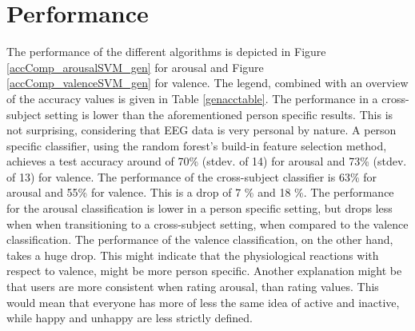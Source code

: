 \section{Performance}
The performance of the different algorithms is depicted in Figure \ref{accComp_arousalSVM_gen} for arousal and Figure \ref{accComp_valenceSVM_gen} for valence. The legend, combined with an overview of the accuracy values is given in Table \ref{genacctable}. The performance in a cross-subject setting is lower than the aforementioned person specific results. This is not surprising, considering that EEG data is very personal by nature. A person specific classifier, using the random forest's build-in feature selection method, achieves a test accuracy around of 70\% (stdev. of 14) for arousal and 73\% (stdev. of 13) for valence. The performance of the cross-subject classifier is 63\% for arousal and 55\% for valence. This is a drop of 7 \% and 18 \%. The performance for the arousal classification is lower in a person specific setting, but drops less when when transitioning to a cross-subject setting, when compared to the valence classification. The performance of the valence classification, on the other hand, takes a huge drop. This might indicate that the physiological reactions with respect to valence, might be more person specific. Another explanation might be that users are more consistent when rating arousal, than rating values. This would mean that everyone has more of less the same idea of active and inactive, while happy and unhappy are less strictly defined.

